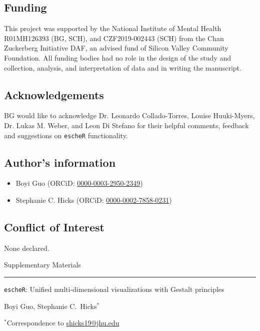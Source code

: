 \documentclass[10pt,twocolumn]{article}
\begin{document}
\subsection*{Funding}
This project was supported by the National Institute of Mental Health R01MH126393 (BG, SCH), and CZF2019-002443 (SCH) from the Chan Zuckerberg Initiative DAF, an advised fund of Silicon Valley Community Foundation. All funding bodies had no role in the design of the study and collection, analysis, and interpretation of data and in writing the manuscript.

\subsection*{Acknowledgements}
BG would like to acknowledge Dr. Leonardo Collado-Torres, Louise Huuki-Myers, Dr. Lukas M. Weber, and Leon Di Stefano for their helpful comments, feedback and suggestions on \texttt{escheR} functionality.



\subsection*{Author’s information}

\begin{itemize}[nosep]
    \item Boyi Guo (ORCiD: \href{https://orcid.org/0000-0003-2950-2349}{0000-0003-2950-2349})
    \item Stephanie C. Hicks (ORCiD: \href{https://orcid.org/0000-0002-7858-0231}{0000-0002-7858-0231})
\end{itemize} 

\subsection*{Conflict of Interest} 
None declared.



\clearpage 



\clearpage
\onecolumn

{\huge Supplementary Materials}

\hrule

\vspace*{0.5cm}

\begin{center}

{\Large \texttt{escheR}: Unified multi-dimensional visualizations with Gestalt principles}

\vspace*{0.75cm}

{\large Boyi Guo, Stephanie C.\ Hicks$^*$}

\vspace*{0.3cm}

{\small $^*$Correspondence to \url{shicks19@jhu.edu}}

\end{center}
\end{document}
